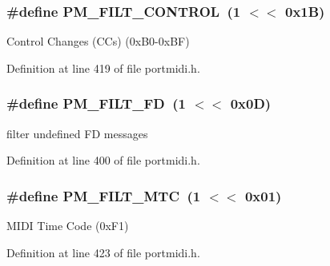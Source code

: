 \subsubsection[{\texorpdfstring{P\+M\+\_\+\+F\+I\+L\+T\+\_\+\+C\+O\+N\+T\+R\+OL}{PM_FILT_CONTROL}}]{\setlength{\rightskip}{0pt plus 5cm}\#define P\+M\+\_\+\+F\+I\+L\+T\+\_\+\+C\+O\+N\+T\+R\+OL~(1 $<$$<$ 0x1\+B)}\hypertarget{group__grp__events__filters_gab37c64bd527f54ec37fb312dabda16b1}{}\label{group__grp__events__filters_gab37c64bd527f54ec37fb312dabda16b1}
Control Changes (CC\textquotesingle{}s) (0x\+B0-\/0x\+BF) 

Definition at line 419 of file portmidi.\+h.

\subsubsection[{\texorpdfstring{P\+M\+\_\+\+F\+I\+L\+T\+\_\+\+FD}{PM_FILT_FD}}]{\setlength{\rightskip}{0pt plus 5cm}\#define P\+M\+\_\+\+F\+I\+L\+T\+\_\+\+FD~(1 $<$$<$ 0x0\+D)}\hypertarget{group__grp__events__filters_gaea41a2172d5c7382f6b9d7df85c62a7c}{}\label{group__grp__events__filters_gaea41a2172d5c7382f6b9d7df85c62a7c}
filter undefined FD messages 

Definition at line 400 of file portmidi.\+h.

\subsubsection[{\texorpdfstring{P\+M\+\_\+\+F\+I\+L\+T\+\_\+\+M\+TC}{PM_FILT_MTC}}]{\setlength{\rightskip}{0pt plus 5cm}\#define P\+M\+\_\+\+F\+I\+L\+T\+\_\+\+M\+TC~(1 $<$$<$ 0x01)}\hypertarget{group__grp__events__filters_ga9209ea350d58f2d1bc404bc1deecce0f}{}\label{group__grp__events__filters_ga9209ea350d58f2d1bc404bc1deecce0f}
M\+I\+DI Time Code (0x\+F1) 

Definition at line 423 of file portmidi.\+h.

